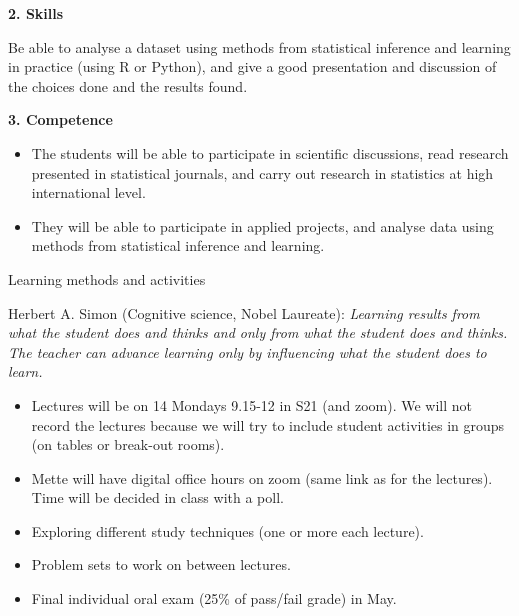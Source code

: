 \documentclass[
  ignorenonframetext,
]{beamer}
\providecommand{\tightlist}{%
  \setlength{\itemsep}{0pt}\setlength{\parskip}{0pt}}
\begin{document}
\begin{frame}

\textbf{2. Skills}

Be able to analyse a dataset using methods from statistical inference
and learning in practice (using R or Python), and give a good
presentation and discussion of the choices done and the results found.

\textbf{3. Competence}

\begin{itemize}
\tightlist
\item
  The students will be able to participate in scientific discussions,
  read research presented in statistical journals, and carry out
  research in statistics at high international level.
\item
  They will be able to participate in applied projects, and analyse data
  using methods from statistical inference and learning.
\end{itemize}

\end{frame}

\begin{frame}

\begin{block}{Learning methods and activities}

Herbert A. Simon (Cognitive science, Nobel Laureate): \emph{Learning
results from what the student does and thinks and only from what the
student does and thinks. The teacher can advance learning only by
influencing what the student does to learn.}

\end{block}

\end{frame}

\begin{frame}

\begin{itemize}
\item
  Lectures will be on 14 Mondays 9.15-12 in S21 (and zoom). We will not
  record the lectures because we will try to include student activities
  in groups (on tables or break-out rooms).
\item
  Mette will have digital office hours on zoom (same link as for the
  lectures). Time will be decided in class with a poll.
\item
  Exploring different study techniques (one or more each lecture).
\item
  Problem sets to work on between lectures.
\item
  Final individual oral exam (25\% of pass/fail grade) in May.
\end{itemize}

\end{frame}
\end{document}
